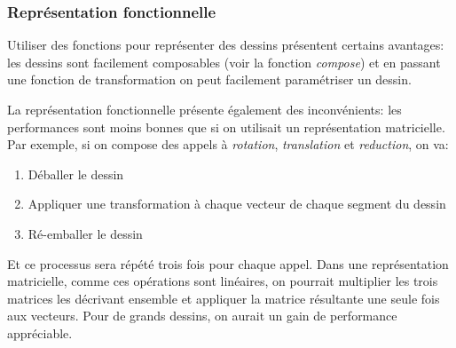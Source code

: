 \documentclass[10pt]{report}
\begin{document}
\subsubsection{Représentation fonctionnelle}

Utiliser des fonctions pour représenter des dessins présentent
certains avantages: les dessins sont facilement composables (voir la
fonction \emph{compose}) et en passant une fonction de transformation
on peut facilement paramétriser un dessin.

La représentation fonctionnelle présente également des inconvénients:
les performances sont moins bonnes que si on utilisait un
représentation matricielle.  Par exemple, si on compose des appels à
\emph{rotation}, \emph{translation} et \emph{reduction}, on va:

\begin{enumerate}
\item Déballer le dessin
\item Appliquer une transformation à chaque vecteur de chaque segment
  du dessin
\item Ré-emballer le dessin
\end{enumerate}

Et ce processus sera répété trois fois pour chaque appel.  Dans une
représentation matricielle, comme ces opérations sont linéaires, on
pourrait multiplier les trois matrices les décrivant ensemble et
appliquer la matrice résultante une seule fois aux vecteurs.  Pour de
grands dessins, on aurait un gain de performance appréciable.
\end{document}

